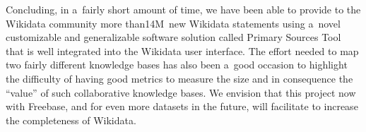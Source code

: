 \documentclass{acm_proc_article-sp}
\begin{document}
Concluding, in a~fairly short amount of time, we have been able
to provide to the Wikidata community more than\linebreak 14M~new Wikidata statements
using a~novel customizable and generalizable software solution called Primary Sources Tool
that is well integrated into the Wikidata user interface.
The effort needed to map two fairly different knowledge bases has also been a~good occasion
to highlight the difficulty of having good metrics to measure the size
and in consequence the ``value'' of such collaborative knowledge bases.
We envision that this project now with Freebase, and for even more datasets in the future,
will facilitate to increase the completeness of Wikidata.




\balancecolumns
\end{document}
